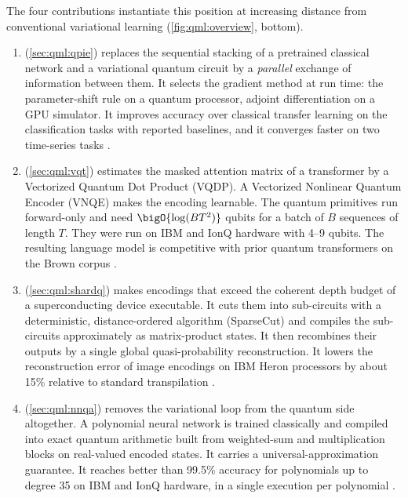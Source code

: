 The four contributions instantiate this position at increasing distance from conventional variational learning (\cref{fig:qml:overview}, bottom).
\begin{enumerate}
\item \qpie{} (\cref{sec:qml:qpie}) replaces the sequential stacking of a pretrained classical network and a variational quantum circuit by a \emph{parallel} exchange of information between them. It selects the gradient method at run time: the parameter-shift rule on a quantum processor, adjoint differentiation on a GPU simulator. It improves accuracy over classical transfer learning on the classification tasks with reported baselines, and it converges faster on two time-series tasks \cite{guo2025qpie}.
\item \vqt{} (\cref{sec:qml:vqt}) estimates the masked attention matrix of a transformer by a Vectorized Quantum Dot Product (VQDP). A Vectorized Nonlinear Quantum Encoder (VNQE) makes the encoding learnable. The quantum primitives run forward-only and need $\bigO{\log (BT^2)}$ qubits for a batch of $B$ sequences of length $T$. They were run on IBM and IonQ hardware with 4--9 qubits. The resulting language model is competitive with prior quantum transformers on the Brown corpus \cite{guo2025vqt}.
\item \shardq{} (\cref{sec:qml:shardq}) makes encodings that exceed the coherent depth budget of a superconducting device executable. It cuts them into sub-circuits with a deterministic, distance-ordered algorithm (SparseCut) and compiles the sub-circuits approximately as matrix-product states. It then recombines their outputs by a single global quasi-probability reconstruction. It lowers the reconstruction error of image encodings on IBM Heron processors by about 15\% relative to standard transpilation \cite{guo2025shardq}.
\item \nnqa{} (\cref{sec:qml:nnqa}) removes the variational loop from the quantum side altogether. A polynomial neural network is trained classically and compiled into exact quantum arithmetic built from weighted-sum and multiplication blocks on real-valued encoded states. It carries a universal-approximation guarantee. It reaches better than 99.5\% accuracy for polynomials up to degree 35 on IBM and IonQ hardware, in a single execution per polynomial \cite{guo2026nnqa}.
\end{enumerate}

